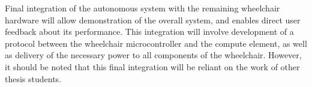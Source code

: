 \documentclass[12pt]{article}
\begin{document}
Final integration of the autonomous system with the remaining wheelchair hardware
will allow demonstration of the overall system, and enables direct user feedback about its performance.
This integration will involve development of a protocol between the wheelchair microcontroller and the compute
element, as well as delivery of the necessary power to all components of the wheelchair.
However, it should be noted that this final integration will be reliant on the work of other thesis students.


\pagebreak





\printbibliography[heading=bibnumbered]
\end{document}
